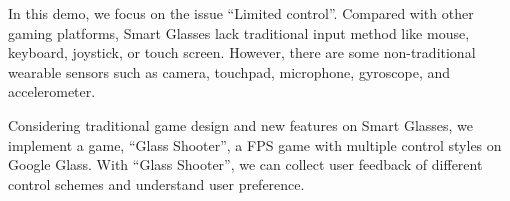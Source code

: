 \documentclass{acm_proc_article-sp}
\begin{document}
In this demo, we focus on the issue ``Limited control''. Compared with other gaming platforms, Smart Glasses lack traditional input method like mouse, keyboard, joystick, or touch screen. However, there are some non-traditional wearable sensors such as camera, touchpad, microphone, gyroscope, and accelerometer.  





Considering traditional game design and new features on Smart Glasses, we implement a game, ``Glass Shooter'', a FPS game with multiple control styles on Google Glass. With ``Glass Shooter'', we can collect user feedback of different control schemes and understand user preference. 
\end{document}
